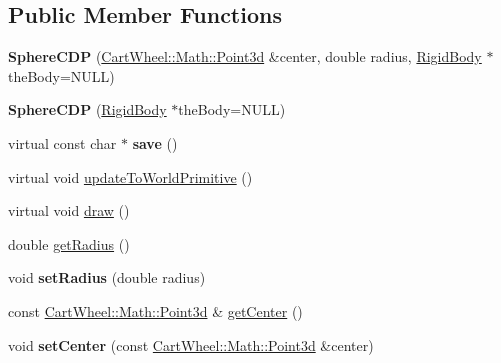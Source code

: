 \subsection*{Public Member Functions}
\begin{DoxyCompactItemize}
\item 
\hypertarget{classCartWheel_1_1Physics_1_1SphereCDP_a14a57be1d32c7442419483177bb5d7da}{
{\bfseries SphereCDP} (\hyperlink{classCartWheel_1_1Math_1_1Point3d}{CartWheel::Math::Point3d} \&center, double radius, \hyperlink{classCartWheel_1_1Physics_1_1RigidBody}{RigidBody} $\ast$theBody=NULL)}
\label{classCartWheel_1_1Physics_1_1SphereCDP_a14a57be1d32c7442419483177bb5d7da}

\item 
\hypertarget{classCartWheel_1_1Physics_1_1SphereCDP_ab5485e203bb13a00ef3b3d4346710ade}{
{\bfseries SphereCDP} (\hyperlink{classCartWheel_1_1Physics_1_1RigidBody}{RigidBody} $\ast$theBody=NULL)}
\label{classCartWheel_1_1Physics_1_1SphereCDP_ab5485e203bb13a00ef3b3d4346710ade}

\item 
\hypertarget{classCartWheel_1_1Physics_1_1SphereCDP_a9fab8a6c509dac3ad66908cad79ebce2}{
virtual const char $\ast$ {\bfseries save} ()}
\label{classCartWheel_1_1Physics_1_1SphereCDP_a9fab8a6c509dac3ad66908cad79ebce2}

\item 
virtual void \hyperlink{classCartWheel_1_1Physics_1_1SphereCDP_ad09c011967bd3207ee5797e540282894}{updateToWorldPrimitive} ()
\item 
virtual void \hyperlink{classCartWheel_1_1Physics_1_1SphereCDP_a02bb51012ee7279a7369fc451276a22f}{draw} ()
\item 
double \hyperlink{classCartWheel_1_1Physics_1_1SphereCDP_ae63b5f19aeec6882e9e6900f41c777dd}{getRadius} ()
\item 
\hypertarget{classCartWheel_1_1Physics_1_1SphereCDP_a9fe0ca6bf46cc5513765ad6e5cb9f1b1}{
void {\bfseries setRadius} (double radius)}
\label{classCartWheel_1_1Physics_1_1SphereCDP_a9fe0ca6bf46cc5513765ad6e5cb9f1b1}

\item 
const \hyperlink{classCartWheel_1_1Math_1_1Point3d}{CartWheel::Math::Point3d} \& \hyperlink{classCartWheel_1_1Physics_1_1SphereCDP_a9a434686c5413df9bae2331ad48c3eff}{getCenter} ()
\item 
\hypertarget{classCartWheel_1_1Physics_1_1SphereCDP_a260f34b45311d891adf249b1738d2845}{
void {\bfseries setCenter} (const \hyperlink{classCartWheel_1_1Math_1_1Point3d}{CartWheel::Math::Point3d} \&center)}
\label{classCartWheel_1_1Physics_1_1SphereCDP_a260f34b45311d891adf249b1738d2845}


\end{DoxyCompactItemize}
